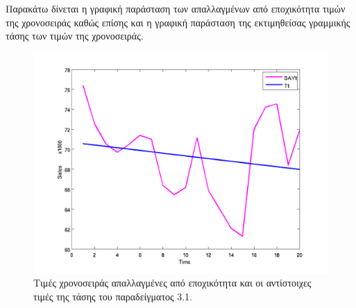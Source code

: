 Παρακάτω δίνεται η γραφική παράσταση των απαλλαγμένων από εποχικότητα τιμών της χρονοσειράς καθώς επίσης και η γραφική παράσταση της εκτιμηθείσας γραμμικής τάσης των τιμών της
χρονοσειράς.

\begin{figure} [ht]
  \centering
  \includegraphics[totalheight=4in,angle=0]{graff4.png}
  \caption{Τιμές χρονοσειράς απαλλαγμένες από εποχικότητα και οι αντίστοιχες τιμές της τάσης του παραδείγματος 3.1.}
\end{figure}


